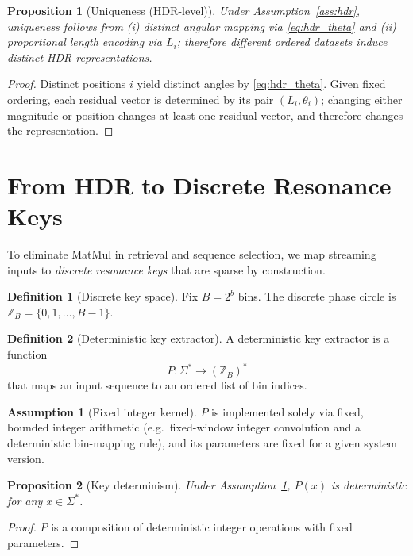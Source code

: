 \documentclass[11pt,a4paper]{article}
\theoremstyle{definition}
\newtheorem{definition}{Definition}[section]
\newtheorem{assumption}{Assumption}[section]
\theoremstyle{plain}
\newtheorem{proposition}{Proposition}[section]
\theoremstyle{remark}
\begin{document}
\begin{proposition}[Uniqueness (HDR-level)]\label{prop:hdr_unique}
Under Assumption~\ref{ass:hdr}, uniqueness follows from (i) distinct angular mapping via \eqref{eq:hdr_theta}
and (ii) proportional length encoding via $L_i$; therefore different ordered datasets induce distinct HDR representations.
\end{proposition}
\begin{proof}
Distinct positions $i$ yield distinct angles by \eqref{eq:hdr_theta}. Given fixed ordering, each residual vector is determined by
its pair $(L_i,\theta_i)$; changing either magnitude or position changes at least one residual vector, and therefore changes the representation.
\end{proof}

\section{From HDR to Discrete Resonance Keys}
To eliminate MatMul in retrieval and sequence selection, we map streaming inputs to \emph{discrete resonance keys}
that are sparse by construction.

\begin{definition}[Discrete key space]
Fix $B=2^b$ bins. The discrete phase circle is $\mathbb{Z}_B = \{0,1,\dots,B-1\}$.
\end{definition}

\begin{definition}[Deterministic key extractor]\label{def:key_extractor}
A deterministic key extractor is a function
\[
P:\Sigma^\ast \to (\mathbb{Z}_B)^\ast
\]
that maps an input sequence to an ordered list of bin indices.
\end{definition}

\begin{assumption}[Fixed integer kernel]\label{ass:kernel}
$P$ is implemented solely via fixed, bounded integer arithmetic (e.g.\ fixed-window integer convolution and a deterministic
bin-mapping rule), and its parameters are fixed for a given system version.
\end{assumption}

\begin{proposition}[Key determinism]\label{prop:key_det}
Under Assumption~\ref{ass:kernel}, $P(x)$ is deterministic for any $x\in\Sigma^\ast$.
\end{proposition}
\begin{proof}
$P$ is a composition of deterministic integer operations with fixed parameters.
\end{proof}
\end{document}
